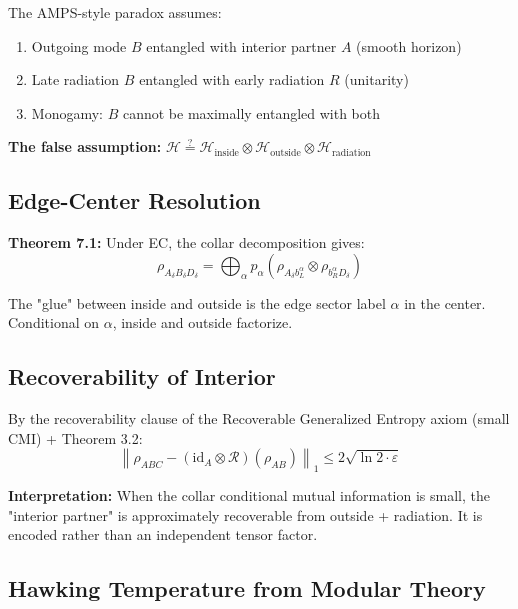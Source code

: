 The AMPS-style paradox assumes:

\begin{enumerate}
\def\labelenumi{\arabic{enumi}.}
\tightlist
\item
 Outgoing mode \(B\) entangled with interior partner \(A\) (smooth horizon)
\item
 Late radiation \(B\) entangled with early radiation \(R\) (unitarity)
\item
 Monogamy: \(B\) cannot be maximally entangled with both
\end{enumerate}

\textbf{The false assumption:} \(\mathcal{H} \stackrel{?}{=} \mathcal{H}_{\text{inside}} \otimes \mathcal{H}_{\text{outside}} \otimes \mathcal{H}_{\text{radiation}}\)

\subsection{Edge-Center Resolution}\label{72-edge-center-resolution}

\textbf{Theorem 7.1:} Under EC, the collar decomposition gives: \[\rho_{A_\delta B_\delta D_\delta} = \bigoplus_\alpha p_\alpha \left(\rho_{A_\delta b_L^\alpha} \otimes \rho_{b_R^\alpha D_\delta}\right)\]

The "glue" between inside and outside is the edge sector label \(\alpha\) in the center. Conditional on \(\alpha\), inside and outside factorize.

\subsection{Recoverability of Interior}\label{73-recoverability-of-interior}

By the recoverability clause of the Recoverable Generalized Entropy axiom (small CMI) + Theorem 3.2: \[\left\|\rho_{ABC} - (\text{id}_A \otimes \mathcal{R})(\rho_{AB})\right\|_1 \leq 2\sqrt{\ln 2 \cdot \varepsilon}\]

\textbf{Interpretation:} When the collar conditional mutual information is small, the "interior partner" is approximately recoverable from outside + radiation. It is encoded rather than an independent tensor factor.

\subsection{Hawking Temperature from Modular Theory}\label{74-hawking-temperature-from-modular-theory}

